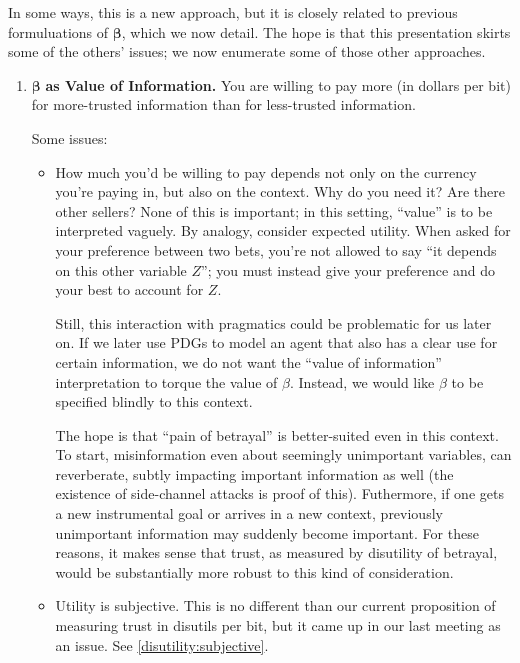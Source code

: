 \documentclass[twoside]{article} %
\theoremstyle{plain}
\theoremstyle{definition}
\newcommand{\bbeta}{\boldsymbol\beta}
\begin{document}
    
    In some ways, this is a new approach, but it is closely related to previous formuluations of $\bbeta$, which we now detail. 
    The hope is that this presentation skirts some of the others' issues; we now enumerate some of those other approaches.
    \smallskip
    \begin{enumerate}
        \item $\bbeta$ \textbf{as Value of Information.} You are willing to pay more (in dollars per bit) for more-trusted information than for less-trusted information. 
        
        Some issues:
        \begin{itemize}
            \item How much you'd be willing to pay depends not only on the currency you're paying in, but also on the context. Why do you need it? Are there other sellers?
              None of this is important; in this setting, ``value'' is to be interpreted vaguely.
              By analogy, consider expected utility. When asked for your preference between two bets, you're not allowed to say ``it depends on this other variable $Z$''; you must instead give your preference and do your best to account for $Z$. 
              
            Still, this interaction with pragmatics could be problematic for us later on. If we later use PDGs to model an agent that also has a clear use for certain information, we do not want the ``value of information'' interpretation to torque the value of $\beta$. Instead, we would like $\beta$ to be specified blindly to this context. 
        
            The hope is that ``pain of betrayal'' is better-suited even in this context. 
            To start, misinformation even about seemingly unimportant variables, can reverberate, subtly impacting important information as well (the existence of side-channel attacks is proof of this). 
            Futhermore, if one gets a new instrumental goal or arrives in a new context, previously unimportant information may suddenly become important. 
            For these reasons, it makes sense that trust, as measured by disutility of betrayal, would be substantially more robust to this kind of consideration.
        
            \item Utility is subjective. This is no different than our current proposition of measuring trust in disutils per bit, but it came up in our last meeting as an issue. See \cref{disutility:subjective}. 
        \end{itemize}
        

\end{enumerate}
\end{document}
